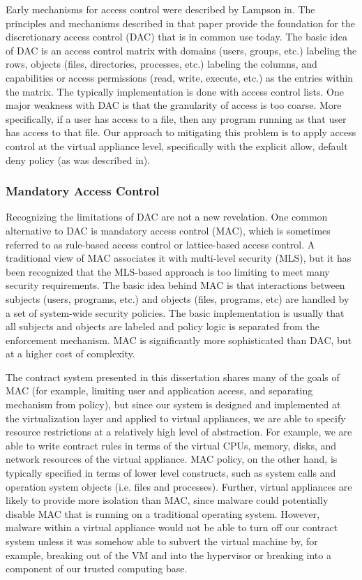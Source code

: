 Early mechanisms for access control were described by Lampson in\cite{lampson_accesscontrol_1974}. The principles and mechanisms described in that paper provide the foundation for the discretionary access control (DAC)\cite{sandhu_dac_1994} that is in common use today. The basic idea of DAC is an access control matrix with domains (users, groups, etc.) labeling the rows, objects (files, directories, processes, etc.) labeling the columns, and capabilities or access permissions (read, write, execute, etc.) as the entries within the matrix. The typically implementation is done with access control lists. One major weakness with DAC is that the granularity of access is too coarse. More specifically, if a user has access to a file, then any program running as that user has access to that file. Our approach to mitigating this problem is to apply access control at the virtual appliance level, specifically with the explicit allow, default deny policy (as was described in\cite{evanchik_thesis_2004}).

\subsubsection{Mandatory Access Control}
\label{sec:mac}

Recognizing the limitations of DAC are not a new revelation. One common alternative to DAC is mandatory access control (MAC), which is sometimes referred to as rule-based access control\cite{lindqvist_mac_2006} or lattice-based access control\cite{denning_mac_1976}. A traditional view of MAC associates it with multi-level security (MLS), but it has been recognized that the MLS-based approach is too limiting to meet many security requirements\cite{loscocco_2001}. The basic idea behind MAC is that interactions between subjects (users, programs, etc.) and objects (files, programs, etc) are handled by a set of system-wide security policies. The basic implementation is usually that all subjects and objects are labeled and policy logic is separated from the enforcement mechanism. MAC is significantly more sophisticated than DAC, but at a higher cost of complexity. 

The contract system presented in this dissertation shares many of the goals of MAC (for example, limiting user and application access, and separating mechanism from policy), but since our system is designed and implemented at the virtualization layer and applied to virtual appliances, we are able to specify resource restrictions at a relatively high level of abstraction. For example, we are able to write contract rules in terms of the virtual CPUs, memory, disks, and network resources of the virtual appliance. MAC policy, on the other hand, is typically specified in terms of lower level constructs, such as system calls and operation system objects (i.e. files and processes). Further, virtual appliances are likely to provide more isolation than MAC, since malware could potentially disable MAC that is running on a traditional operating system. However, malware within a virtual appliance would not be able to turn off our contract system unless it was somehow able to subvert the virtual machine by, for example, breaking out of the VM and into the hypervisor or breaking into a component of our trusted computing base. 

